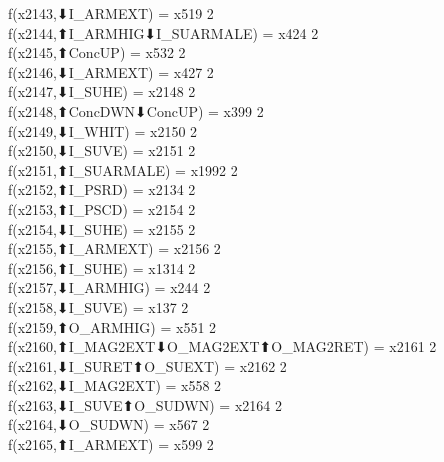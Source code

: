 f(x2143,⬇I_ARMEXT) = x519 {2} \\
f(x2144,⬆I_ARMHIG⬇I_SUARMALE) = x424 {2} \\
f(x2145,⬆ConcUP) = x532 {2} \\
f(x2146,⬇I_ARMEXT) = x427 {2} \\
f(x2147,⬇I_SUHE) = x2148 {2} \\
f(x2148,⬆ConcDWN⬇ConcUP) = x399 {2} \\
f(x2149,⬇I_WHIT) = x2150 {2} \\
f(x2150,⬇I_SUVE) = x2151 {2} \\
f(x2151,⬆I_SUARMALE) = x1992 {2} \\
f(x2152,⬆I_PSRD) = x2134 {2} \\
f(x2153,⬆I_PSCD) = x2154 {2} \\
f(x2154,⬇I_SUHE) = x2155 {2} \\
f(x2155,⬆I_ARMEXT) = x2156 {2} \\
f(x2156,⬆I_SUHE) = x1314 {2} \\
f(x2157,⬇I_ARMHIG) = x244 {2} \\
f(x2158,⬇I_SUVE) = x137 {2} \\
f(x2159,⬆O_ARMHIG) = x551 {2} \\
f(x2160,⬆I_MAG2EXT⬇O_MAG2EXT⬆O_MAG2RET) = x2161 {2} \\
f(x2161,⬇I_SURET⬆O_SUEXT) = x2162 {2} \\
f(x2162,⬇I_MAG2EXT) = x558 {2} \\
f(x2163,⬇I_SUVE⬆O_SUDWN) = x2164 {2} \\
f(x2164,⬇O_SUDWN) = x567 {2} \\
f(x2165,⬆I_ARMEXT) = x599 {2} \\
